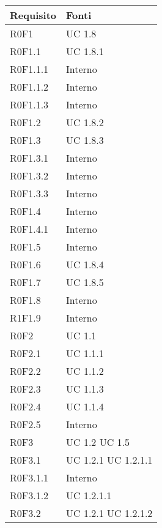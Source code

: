 	\begin{center}

	\def\arraystretch{1.5}
	\bgroup
	\begin{longtable}{| p{4cm} | p{4cm} |}

		\hline
		\textbf{Requisito} & \textbf{Fonti} \\
		\hline


		R0F1  & UC 1.8 \\
		\hline
		R0F1.1  &  UC 1.8.1 \\
		\hline
		R0F1.1.1  &  Interno \\
		\hline
		R0F1.1.2  &  Interno \\
		\hline
		R0F1.1.3  &  Interno \\
		\hline
		R0F1.2  &  UC 1.8.2 \\
		\hline
		R0F1.3  &  UC 1.8.3 \\
		\hline
		R0F1.3.1  &  Interno \\
		\hline
		R0F1.3.2  &  Interno \\
		\hline
		R0F1.3.3  &  Interno \\
		\hline
		R0F1.4  &  Interno \\
		\hline
		R0F1.4.1  &  Interno \\
		\hline
		R0F1.5  &  Interno \\
		\hline
		R0F1.6  &  UC 1.8.4 \\
		\hline
		R0F1.7  &  UC 1.8.5 \\
		\hline
		R0F1.8  &  Interno \\
		\hline
		R1F1.9  &  Interno \\
		\hline
		R0F2  &  UC 1.1 \\
		\hline
		R0F2.1  &  UC 1.1.1 \\
		\hline
		R0F2.2  &  UC 1.1.2 \\
		\hline
		R0F2.3  &  UC 1.1.3 \\
		\hline
		R0F2.4  &  UC 1.1.4 \\
		\hline
		R0F2.5  &  Interno  \\
		\hline
		R0F3  &  UC 1.2 \newline UC 1.5 \\
		\hline
		R0F3.1  &  UC 1.2.1 \newline UC 1.2.1.1 \\
		\hline
		R0F3.1.1  &  Interno \\
		\hline
		R0F3.1.2  &  UC 1.2.1.1 \\
		\hline
		R0F3.2  &  UC 1.2.1 \newline UC 1.2.1.2 \\

\end{longtable}
\end{center}
